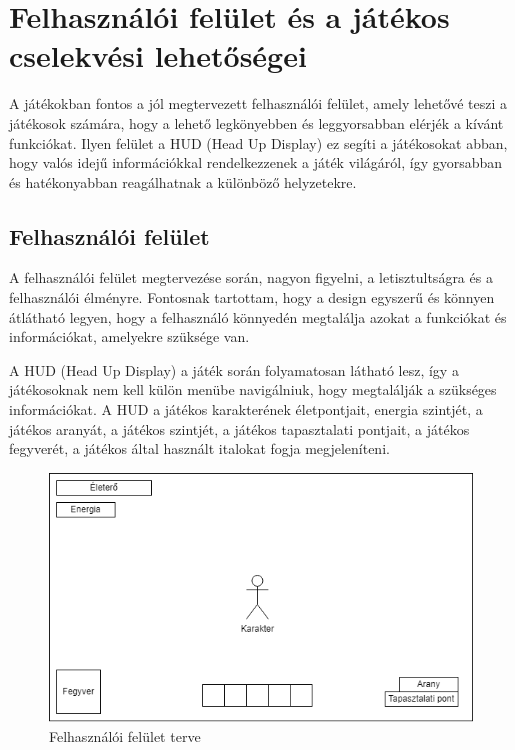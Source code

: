 \section{Felhasználói felület és a játékos cselekvési lehetőségei}

A játékokban fontos a jól megtervezett felhasználói felület, amely lehetővé teszi a játékosok számára, hogy a lehető legkönyebben és leggyorsabban elérjék a kívánt funkciókat. Ilyen felület a HUD (Head Up Display)  ez segíti a játékosokat abban, hogy valós idejű információkkal rendelkezzenek a játék világáról, így gyorsabban és hatékonyabban reagálhatnak a különböző helyzetekre.


\subsection{Felhasználói felület}

A felhasználói felület megtervezése során, nagyon figyelni, a letisztultságra és a felhasználói élményre. Fontosnak tartottam, hogy a design egyszerű és könnyen átlátható legyen, hogy a felhasználó könnyedén megtalálja azokat a funkciókat és információkat, amelyekre szüksége van.

A HUD (Head Up Display) a játék során folyamatosan látható lesz, így a játékosoknak nem kell külön menübe navigálniuk, hogy megtalálják a szükséges információkat. A HUD a játékos karakterének életpontjait, energia szintjét, a játékos aranyát, a játékos szintjét, a játékos tapasztalati pontjait, a játékos fegyverét, a játékos által használt italokat fogja megjeleníteni.

\begin{figure}[H]
    \centering
    \includegraphics[width=14.0truecm]{images/MS_UI.drawio.png}
    \caption{Felhasználói felület terve}
    \label{fig:Felhasználói felület}
\end{figure}

